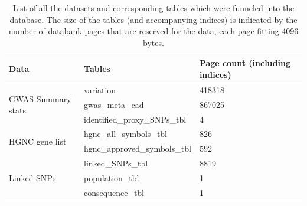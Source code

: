     \begin{table}[h!]
    \capstart
    \centering
    \begin{minipage}{\captionwidth}
        \caption[db tables]{\newline
        List of all the datasets and corresponding tables which were funneled into the database. The size of the tables (and accompanying indices) is indicated by the number of databank pages that are reserved for the data, each page fitting 4096 bytes.}
        \label{tab:db_tables}
    \end{minipage}
        \begin{tabular}{l|l|l}
        Data                                       & Tables                             & Page count (including indices)                                                                      \\ \hline
        \multirow{3}{*}{GWAS Summary stats}        & variation                          & 418318                                                                                              \\
                                                   & gwas\_meta\_cad                    & 867025                                                                                              \\
                                                   & identified\_proxy\_SNPs\_tbl       & 4                                                                                                   \\ \hline
        \multirow{2}{*}{HGNC gene list}            & hgnc\_all\_symbols\_tbl            & 826                                                                                                 \\
                                                   & hgnc\_approved\_symbols\_tbl       & 592                                                                                                 \\ \hline
        \multirow{3}{*}{Linked SNPs}               & linked\_SNPs\_tbl                  & 8819                                                                                                \\
                                                   & population\_tbl                    & 1                                                                                                   \\
                                                   & consequence\_tbl                   & 1                                                                                                   \\ \hline

\end{tabular}
\end{table}
